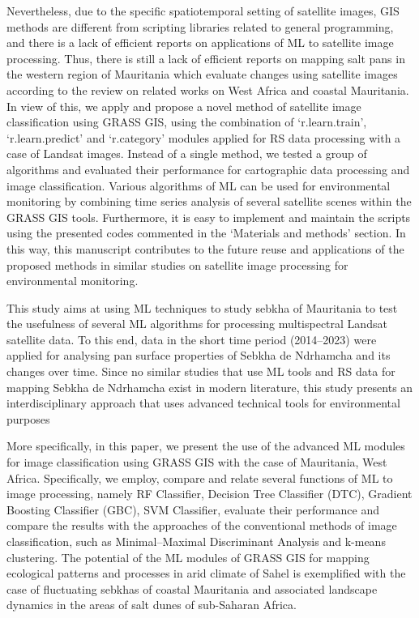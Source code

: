 \documentclass[12pt,a4paper,oneside]{article}
\def \newpar{\vspace{6pt}}
\begin{document}
\newpar Nevertheless, due to the specific spatiotemporal setting of satellite images, GIS methods are different from scripting libraries related to general programming, and there is a lack of efficient reports on applications of ML to satellite image processing. Thus, there is still a lack of efficient reports on mapping salt pans in the western region of Mauritania which evaluate changes using satellite images according to the review on related works on West Africa and coastal Mauritania. In view of this, we apply and propose a novel method of satellite image classification using GRASS GIS, using the combination of ‘r.learn.train’, ‘r.learn.predict’ and ‘r.category’ modules applied for RS data processing with a case of Landsat images. Instead of a single method, we tested a group of algorithms and evaluated their performance for cartographic data processing and image classification. Various algorithms of ML can be used for environmental monitoring by combining time series analysis of several satellite scenes within the GRASS GIS tools. Furthermore, it is easy to implement and maintain the scripts using the presented codes commented in the ‘Materials and methods’ section. In this way, this manuscript contributes to the future reuse and applications of the proposed methods in similar studies on satellite image processing for environmental monitoring.

\newpar This study aims at using ML techniques to study sebkha of Mauritania to test the usefulness of several ML algorithms for processing multispectral Landsat satellite data. To this end, data in the short time period (2014–2023) were applied for analysing pan surface properties of Sebkha de Ndrhamcha and its changes over time. Since no similar studies that use ML tools and RS data for mapping Sebkha de Ndrhamcha exist in modern literature, this study presents an interdisciplinary approach that uses advanced technical tools for environmental purposes

\newpar More specifically, in this paper, we present the use of the advanced ML modules for image classification using GRASS GIS  \citep{GRASS_GIS_software} with the case of Mauritania, West Africa. Specifically, we employ, compare and relate several functions of ML to image processing, namely RF Classifier, Decision Tree Classifier (DTC), Gradient Boosting Classifier (GBC), SVM Classifier, evaluate their performance and compare the results with the approaches of the conventional methods of image classification, such as Minimal–Maximal Discriminant Analysis and k-means clustering. The potential of the ML modules of GRASS GIS \citep{NetelerMitasova2002} for mapping ecological patterns and processes in arid climate of Sahel is exemplified with the case of fluctuating sebkhas of coastal Mauritania and associated landscape dynamics in the areas of salt dunes of sub-Saharan Africa.
\end{document}

